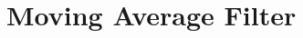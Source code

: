 \documentclass[11pt,a4paper,oneside]{book}
\numberwithin{equation}{section}
\theoremstyle{it}
\theoremstyle{definition}
\begin{document}
%

\chapter{Moving Average Filter}	
\end{document}
